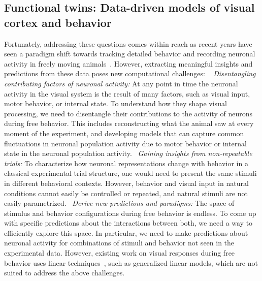 \documentclass[B2,COG]{ercgrant}
\begin{document}
\subsection{Functional twins: Data-driven models of visual cortex and behavior} 
Fortunately, addressing these questions comes within reach as recent years have seen a paradigm shift towards tracking detailed behavior and recording neuronal activity in freely moving animals~\parencite{Wallace2013-lf,Del_Grosso2017-ww,Mathis2018-lk,Cai2016-rh, Parker2022-ac}.
However, extracting meaningful insights and predictions from these data poses new computational challenges: ~
\textit{Disentangling contributing factors of neuronal activity:}
At any point in time the neuronal activity in the visual system is the result of many factors, such as visual input, motor behavior, or internal state. 
To understand how they shape visual processing, we need to disentangle their contributions to the activity of neurons during free behavior. 
This includes reconstructing what the animal saw at every moment of the experiment, and developing models that can capture common fluctuations in neuronal population activity due to motor behavior or internal state in the neuronal population activity.
~\textit{Gaining insights from non-repeatable trials:} 
To characterize how neuronal representations change with behavior in a classical experimental trial structure, one would need to present the same stimuli in different behavioral contexts. 
However, behavior and visual input in natural conditions cannot easily be controlled or repeated, and natural stimuli are not easily parametrized.
~\textit{Derive new predictions and paradigms:} The space of stimulus and behavior configurations during free behavior is endless.
To come up with specific predictions about the interactions between both, we need a way to efficiently explore this space. 
In particular, we need to make predictions about neuronal activity for combinations of stimuli and behavior not seen in the experimental data.
However, existing work on visual responses during free behavior uses linear techniques~\parencite{Parker2022-ac}, such as generalized linear models, which are not suited to address the above challenges.
\end{document}
